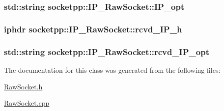 \hypertarget{classsocketpp_1_1IP__RawSocket_05761cfc5307ac731cb05fdc0f500469}{
\subsubsection[{IP\_\-opt}]{\setlength{\rightskip}{0pt plus 5cm}std::string {\bf socketpp::IP\_\-RawSocket::IP\_\-opt}}}
\label{classsocketpp_1_1IP__RawSocket_05761cfc5307ac731cb05fdc0f500469}


\hypertarget{classsocketpp_1_1IP__RawSocket_005f2299268c452f0e1689d070fa0cab}{
\subsubsection[{rcvd\_\-IP\_\-h}]{\setlength{\rightskip}{0pt plus 5cm}iphdr {\bf socketpp::IP\_\-RawSocket::rcvd\_\-IP\_\-h}}}
\label{classsocketpp_1_1IP__RawSocket_005f2299268c452f0e1689d070fa0cab}


\hypertarget{classsocketpp_1_1IP__RawSocket_0457fe2b23f01b7304e2bf1441fc7300}{
\subsubsection[{rcvd\_\-IP\_\-opt}]{\setlength{\rightskip}{0pt plus 5cm}std::string {\bf socketpp::IP\_\-RawSocket::rcvd\_\-IP\_\-opt}}}
\label{classsocketpp_1_1IP__RawSocket_0457fe2b23f01b7304e2bf1441fc7300}




The documentation for this class was generated from the following files:\begin{CompactItemize}
\item 
\hyperlink{RawSocket_8h}{RawSocket.h}\item 
\hyperlink{RawSocket_8cpp}{RawSocket.cpp}\end{CompactItemize}
